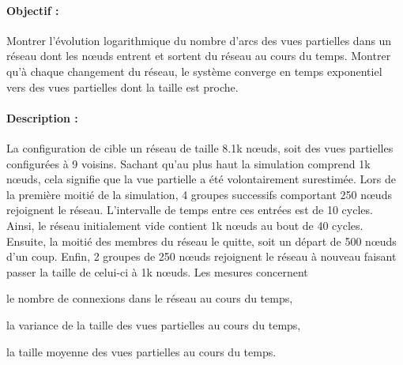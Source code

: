 \paragraph{Objectif :} Montrer l'évolution logarithmique du nombre d'arcs des
vues partielles dans un réseau dont les nœuds entrent et sortent du réseau au
cours du temps. Montrer qu'à chaque changement du réseau, le système converge en
temps exponentiel vers des vues partielles dont la taille est proche.

\paragraph{Description :} La configuration de \CYCLON cible un réseau de taille
8.1k nœuds, soit des vues partielles configurées à 9 voisins. Sachant qu'au plus
haut la simulation comprend 1k nœuds, cela signifie que la vue partielle a été
volontairement surestimée. Lors de la première moitié de la simulation, 4
groupes successifs comportant 250 nœuds rejoignent le réseau. L'intervalle de
temps entre ces entrées est de 10 cycles. Ainsi, le réseau initialement vide
contient 1k nœuds au bout de 40 cycles. Ensuite, la moitié des membres du réseau
le quitte, soit un départ de 500 nœuds d'un coup. Enfin, 2 groupes de 250 nœuds
rejoignent le réseau à nouveau faisant passer la taille de celui-ci à 1k
nœuds. Les mesures concernent
\begin{inparaenum}[(i)]
\item le nombre de connexions dans le réseau au cours du temps,
\item la variance de la taille des vues partielles au cours du temps,
\item la taille moyenne des vues partielles au cours du temps.
\end{inparaenum}

